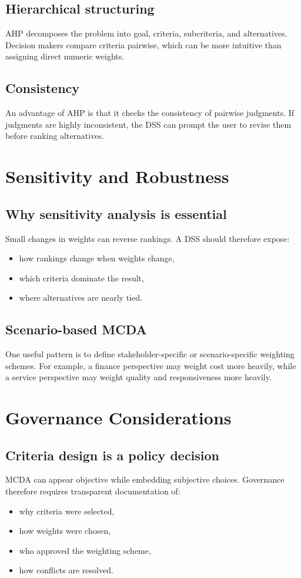 \subsection{Hierarchical structuring}
AHP decomposes the problem into goal, criteria, subcriteria, and alternatives.
Decision makers compare criteria pairwise, which can be more intuitive than
assigning direct numeric weights.

\subsection{Consistency}
An advantage of AHP is that it checks the consistency of pairwise judgments. If
judgments are highly inconsistent, the DSS can prompt the user to revise them
before ranking alternatives.

\section{Sensitivity and Robustness}

\subsection{Why sensitivity analysis is essential}
Small changes in weights can reverse rankings. A DSS should therefore expose:
\begin{itemize}
  \item how rankings change when weights change,
  \item which criteria dominate the result,
  \item where alternatives are nearly tied.
\end{itemize}

\subsection{Scenario-based MCDA}
One useful pattern is to define stakeholder-specific or scenario-specific
weighting schemes. For example, a finance perspective may weight cost more
heavily, while a service perspective may weight quality and responsiveness more
heavily.

\section{Governance Considerations}

\subsection{Criteria design is a policy decision}
MCDA can appear objective while embedding subjective choices. Governance
therefore requires transparent documentation of:
\begin{itemize}
  \item why criteria were selected,
  \item how weights were chosen,
  \item who approved the weighting scheme,
  \item how conflicts are resolved.
\end{itemize}

